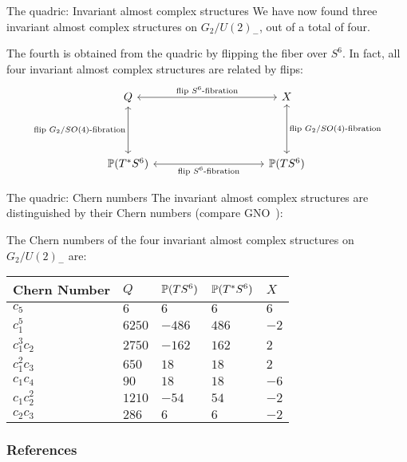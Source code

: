 \documentclass[11pt,parskip]{beamer}
\begin{document}
\begin{frame}[fragile]{The quadric: Invariant almost complex structures}
	We have now found three invariant almost complex structures on $G_2/U(2)_-$, out of a total of four.\pause  
	\medskip
	
	The fourth is obtained from the quadric by flipping the fiber over $S^6$. In fact, all four invariant almost complex structures are related by flips: 
	\begin{equation*}
		\begin{tikzcd}[column sep=3.5cm,row sep=1.5cm]
			Q \ar[r,leftrightarrow,"\text{flip }S^6\text{-fibration}"] 
			\ar[d,leftrightarrow,"\text{flip }G_2/SO(4)\text{-fibration}"']
			& X \ar[d,leftrightarrow,"\text{flip }G_2/SO(4)\text{-fibration}"]\\
			\P(T^*S^6) \ar[r,leftrightarrow,"\text{flip }S^6\text{-fibration}"']
			& \P(TS^6)
		\end{tikzcd}
	\end{equation*}
\end{frame}

\begin{frame}{The quadric: Chern numbers}
	The invariant almost complex structures are distinguished by their Chern numbers (compare GNO~\cite{GNO2017}):
	\begin{prop}
		The Chern numbers of the four invariant almost complex structures on $G_2/U(2)_-$ are:\vspace{-0.4cm}
		\begin{table}[ht!]\centering\hspace{1cm}
			\begin{tabular}{lllll} \toprule
				Chern Number& $Q$		& $\P(TS^6)$ 	& $\P(T^*S^6)$	& $X$ \\ \midrule
				$c_5$ 		& $6$ 		& $6$ 			& $6$			& $6$\\
				$c_1^5$ 	& $6250$	& $-486$		& $486$			& $-2$\\
				$c_1^3c_2$	& $2750$ 	& $-162$		& $162$			& $2$\\
				$c_1^2c_3$	& $650$ 	& $18$ 			& $18$			& $2$\\
				$c_1c_4$	& $90$ 		& $18$ 			& $18$			& $-6$\\
				$c_1c_2^2$	& $1210$ 	& $-54$ 		& $54$			& $-2$\\
				$c_2c_3$	& $286$ 	& $6$			& $6$			& $-2$\\ \bottomrule
			\end{tabular}
		\end{table}
	\end{prop}
\end{frame}

\begin{frame}
	
\end{frame}

\begin{frame}[allowframebreaks]\frametitle{References}
\printbibliography
\end{frame}
	
	
\end{document}
